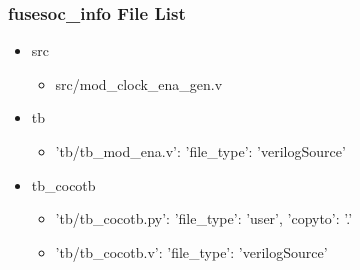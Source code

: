 \subsubsection{fusesoc\_info File List}
\begin{itemize}
\item src
	\begin{itemize}
	\item src/mod\_clock\_ena\_gen.v
	\end{itemize}
\item tb
	\begin{itemize}
	\item {'tb/tb\_mod\_ena.v': {'file\_type': 'verilogSource'}}
	\end{itemize}
\item tb\_cocotb
	\begin{itemize}
	\item {'tb/tb\_cocotb.py': {'file\_type': 'user', 'copyto': '.'}}
	\item {'tb/tb\_cocotb.v': {'file\_type': 'verilogSource'}}
	\end{itemize}
\end{itemize}
